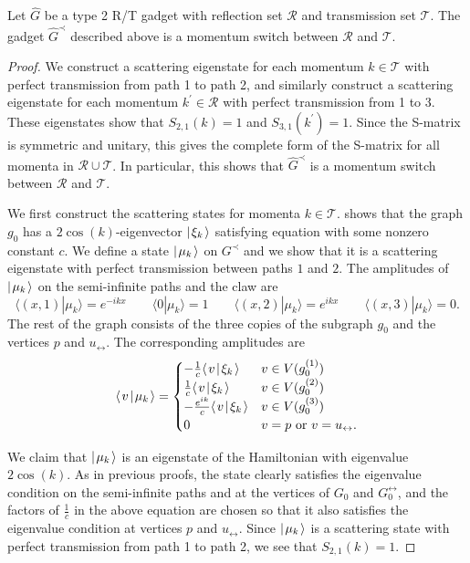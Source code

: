 \documentclass[../thesis-main/thesis-main]{subfiles}
\begin{document}
\begin{lemma}\label{lem:mom_switch_construction}
Let $\hat{G}$ be a type 2 R/T gadget with reflection set $\mathcal{R}$ and transmission set $\mathcal{T}$.  The gadget $\hat{G}^{\prec}$ described above is a momentum switch between $\mathcal{R}$ and $\mathcal{T}$.
\end{lemma}


\begin{proof}

We construct a scattering eigenstate for each momentum $k\in \mathcal{T}$ with perfect transmission from path 1 to path 2, and similarly construct a scattering eigenstate for each momentum $k^{\prime}\in \mathcal{R}$ with perfect transmission from 1 to 3.  These eigenstates show that $S_{2,1}(k) = 1$ and $S_{3,1}(k^\prime) = 1$. Since the S-matrix is symmetric and unitary, this gives the complete form of the S-matrix for all momenta in $\mathcal{R}\cup\mathcal{T}$.  In particular, this shows that $\hat{G}^{\prec}$ is a momentum switch between $\mathcal{R}$ and $\mathcal{T}$.

We first construct the scattering states for momenta $k\in \mathcal{T}$.   shows that the graph $g_0$ has a $2\cos(k)$-eigenvector $|\mspace{2mu} \xi_k \mspace{2mu} \rangle$ satisfying equation  with some nonzero constant $c$. We define a state $|\mspace{2mu} \mu_k \mspace{2mu} \rangle$ on $G^{\prec}$ and we show that it is a scattering eigenstate with perfect transmission between paths $1$ and $2$.   The amplitudes of $|\mspace{2mu} \mu_k \mspace{2mu} \rangle$ on the semi-infinite paths and the claw are
\[
  \langle (x,1)|\mu_k\rangle=e^{-ikx} \qquad 
  \langle 0|\mu_k\rangle=1 \qquad 
  \langle (x,2)|\mu_k\rangle=e^{ikx} \qquad
  \langle (x,3)|\mu_k\rangle=0.
\]
The rest of the graph consists of the three copies of the subgraph $g_0$ and the vertices $p$ and $u_{\leftrightarrow}$. The corresponding amplitudes are
\[
  \langle\mspace{2mu} v \mspace{2mu} | \mspace{2mu} \mu_k\mspace{2mu} \rangle =
  \begin{cases}
	  -\frac{1}{c}\langle\mspace{2mu} v \mspace{2mu} | \mspace{2mu} \xi_k\mspace{2mu} \rangle & v\in V(g^{(1)}_0) \\
    \frac{1}{c}\langle\mspace{2mu} v \mspace{2mu} | \mspace{2mu} \xi_k\mspace{2mu} \rangle & v \in V(g^{(2)}_0) \\
	  -\frac{e^{ik}}{c} \langle\mspace{2mu} v \mspace{2mu} | \mspace{2mu} \xi_k\mspace{2mu} \rangle & v \in V(g^{(3)}_0) \\
  	0 & v=p \text{ or } v=u_{\leftrightarrow}.
  \end{cases}
\]

We claim that $|\mspace{2mu} \mu_k \mspace{2mu} \rangle$ is an eigenstate of the Hamiltonian with eigenvalue $2\cos(k)$.  As in previous proofs, the state clearly satisfies the eigenvalue condition on the semi-infinite paths and at the vertices of $G_0$ and $G_0^\leftrightarrow$, and the factors of $\frac{1}{c}$ in the above equation are chosen so that it also satisfies the eigenvalue condition at vertices $p$ and $u_\leftrightarrow$. Since $|\mspace{2mu} \mu_k \mspace{2mu} \rangle$ is a scattering state with perfect transmission from path 1 to path 2, we see that $S_{2,1}(k) = 1$.


\end{proof}
\end{document}
